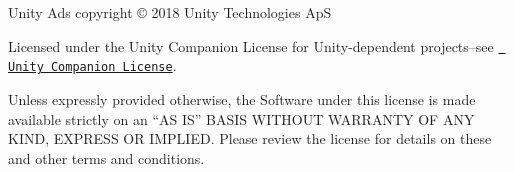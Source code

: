 Unity Ads copyright © 2018 Unity Technologies ApS

Licensed under the Unity Companion License for Unity-\/dependent projects--see \href{http://www.unity3d.com/legal/licenses/Unity_Companion_License}{\texttt{ Unity Companion License}}.

Unless expressly provided otherwise, the Software under this license is made available strictly on an “\+AS I\+S” B\+A\+S\+IS W\+I\+T\+H\+O\+UT W\+A\+R\+R\+A\+N\+TY OF A\+NY K\+I\+ND, E\+X\+P\+R\+E\+SS OR I\+M\+P\+L\+I\+ED. Please review the license for details on these and other terms and conditions. 
